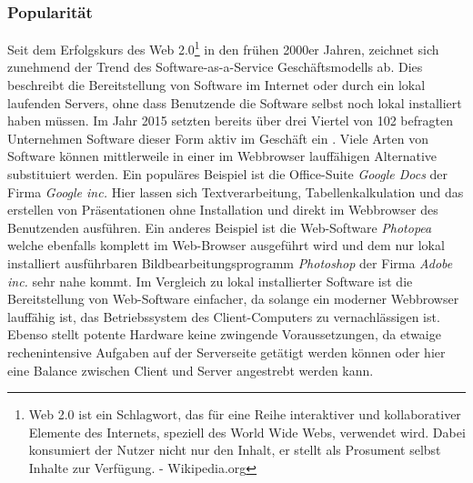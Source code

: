 \subsubsection{Popularität}\label{sec:websoftpopular}
Seit dem Erfolgskurs des Web 2.0\footnote{Web 2.0 ist ein Schlagwort, das für eine Reihe interaktiver und kollaborativer Elemente des Internets, speziell des World Wide Webs, verwendet wird. Dabei konsumiert der Nutzer nicht nur den Inhalt, er stellt als Prosument selbst Inhalte zur Verfügung. - Wikipedia.org} in den frühen 2000er Jahren, zeichnet sich zunehmend der Trend des Software-as-a-Service Geschäftsmodells ab. Dies beschreibt die Bereitstellung von Software im Internet oder durch ein lokal laufenden Servers, ohne dass Benutzende die Software selbst noch lokal installiert haben müssen. Im Jahr 2015 setzten bereits über drei Viertel von 102 befragten Unternehmen Software dieser Form aktiv im Geschäft ein \cite{TecArt-GmbH2019:online}. Viele Arten von Software können  mittlerweile in einer im Webbrowser lauffähigen Alternative substituiert werden. Ein populäres Beispiel ist die Office-Suite \emph{Google Docs} der Firma \emph{Google inc.} Hier lassen sich Textverarbeitung, Tabellenkalkulation und das erstellen von Präsentationen ohne Installation und direkt im Webbrowser des Benutzenden ausführen. Ein anderes Beispiel ist die Web-Software \emph{Photopea} welche ebenfalls komplett im Web-Browser ausgeführt wird und dem nur lokal installiert ausführbaren Bildbearbeitungsprogramm \emph{Photoshop} der Firma \emph{Adobe inc.} sehr nahe kommt. Im Vergleich zu lokal installierter Software ist die Bereitstellung von Web-Software einfacher, da solange ein moderner Webbrowser lauffähig ist, das Betriebssystem des Client-Computers zu vernachlässigen ist. Ebenso stellt potente Hardware keine zwingende Voraussetzungen, da etwaige rechenintensive Aufgaben auf der Serverseite getätigt werden können oder hier eine Balance zwischen Client und Server angestrebt werden kann. \\ 

